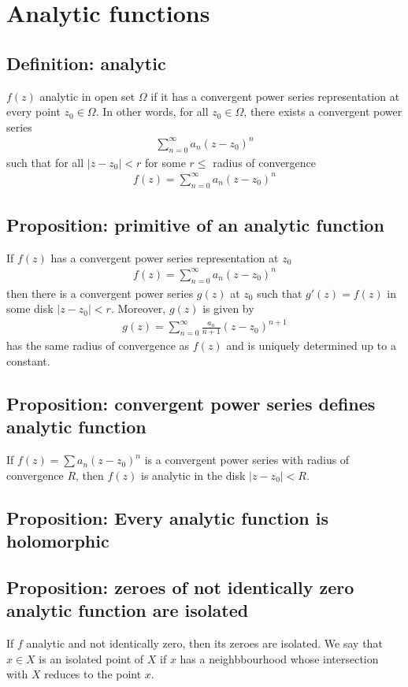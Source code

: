 \documentclass[11pt]{article}
\begin{document}
\section{Analytic functions}
\subsection{Definition: analytic}
$f(z)$ analytic in open set $\Omega$ if it has a convergent power series representation at every point $z_0 \in \Omega$. In other words, for all $z_0 \in \Omega$, there exists a convergent power series
\begin{align*}
    \sum_{n=0}^\infty a_n (z - z_0)^n
\end{align*}
such that for all $|z-z_0| < r$ for some $r \leq$ radius of convergence
\begin{align*}
    f(z) = \sum_{n=0}^\infty a_n (z-z_0)^n 
\end{align*}

\subsection{Proposition: primitive of an analytic function}
If $f(z)$ has a convergent power series representation at $z_0$
\begin{align*}
    f(z) = \sum_{n=0}^\infty a_n (z-z_0)^n 
\end{align*}
then there is a convergent power series $g(z)$ at $z_0$ such that $g'(z) = f(z)$ in some disk $|z-z_0| < r$. Moreover, $g(z)$ is given by 
\begin{align*}
    g(z) = \sum_{n=0}^\infty \frac{a_n}{n+1}(z-z_0)^{n+1}
\end{align*}
has the same radius of convergence as $f(z)$ and is uniquely determined up to a constant.

\subsection{Proposition: convergent power series defines analytic function}
If $f(z) = \sum a_n (z - z_0)^n $ is a convergent power series with radius of convergence $R$, then $f(z)$ is analytic in the disk $|z-z_0| < R$. 

\subsection{Proposition: Every analytic function is holomorphic}

\subsection{Proposition: zeroes of not identically zero analytic function are isolated}
If $f$ analytic and not identically zero, then its zeroes are isolated. We say that $x \in X$ is an isolated point of $X$ if $x$ has a neighbbourhood whose intersection with $X$ reduces to the point $x$. 
\end{document}
